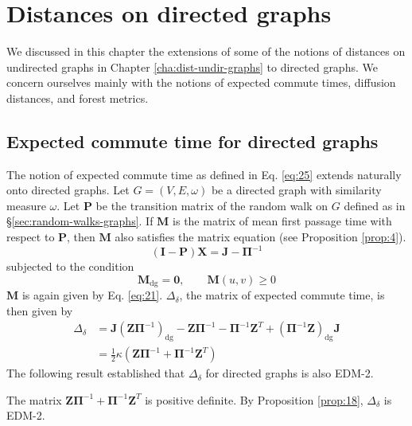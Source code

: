 \chapter{Distances on directed graphs}
\label{cha:dist-direct-graphs}
We discussed in this chapter the extensions of some of the notions of
distances on undirected graphs in Chapter \ref{cha:dist-undir-graphs}
to directed graphs. We concern ourselves mainly with the notions of
expected commute times, diffusion distances, and forest metrics. 
\section{Expected commute time for directed graphs}
\label{sec:expect-comm-time-1}
The notion of expected commute time as defined in
Eq. \eqref{eq:25} extends naturally onto directed graphs. Let $G =
(V,E,\omega)$ be a directed graph with similarity measure
$\omega$. Let $\mathbf{P}$ be the transition matrix of the random walk
on $G$ defined as in \S \ref{sec:random-walks-graphs}. 
If $\mathbf{M}$ is the matrix of mean first passage time with respect
to $\mathbf{P}$, then $\mathbf{M}$ also satisfies the matrix equation
(see Proposition \ref{prop:4}). 
\begin{equation*}
   (\mathbf{I} - \mathbf{P})\mathbf{X} = \mathbf{J} - \bm{\Pi}^{-1}
\end{equation*}
subjected to the condition 
\begin{equation*}
 \mathbf{M}_{\mathrm{dg}} = \mathbf{0}, \qquad \mathbf{M}(u,v) \geq 0   
\end{equation*}
$\mathbf{M}$ is again given by
Eq. \eqref{eq:21}. $\Delta_{\delta}$, the matrix of expected commute
time, is then given by
\begin{equation}
  \label{eq:73}
  \begin{split}
    \Delta_\delta &= \mathbf{J}(\mathbf{Z}\bm{\Pi}^{-1})_{\mathrm{dg}}
    - \mathbf{Z}\bm{\Pi}^{-1} - \bm{\Pi}^{-1}\mathbf{Z}^{T} +
    (\bm{\Pi}^{-1}\mathbf{Z})_{\mathrm{dg}}\mathbf{J} \\ \ &=
    \tfrac{1}{2}\kappa(\mathbf{Z}\bm{\Pi}^{-1} +
    \mathbf{\Pi}^{-1}\mathbf{Z}^{T})
  \end{split}
\end{equation}
%
The following result established that $\Delta_{\delta}$ for directed
graphs is also EDM-2.
\begin{proposition}
  \label{prop:19}
 The matrix $\mathbf{Z}\bm{\Pi}^{-1} + \bm{\Pi}^{-1}\mathbf{Z}^{T}$ is
 positive definite. By Proposition \ref{prop:18},
 $\Delta_{\delta}$ is EDM-2.  
\end{proposition}

